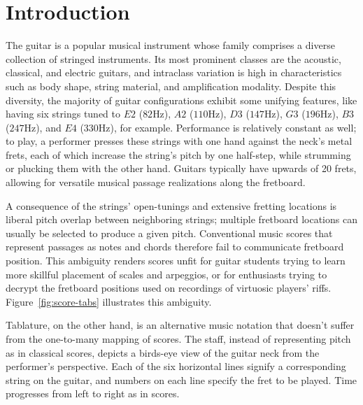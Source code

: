 \documentclass[12pt]{cmuthesis}
\begin{document}
\chapter{Introduction} 
The guitar is a popular musical instrument whose family comprises a diverse collection of stringed instruments. Its most prominent classes are the acoustic, classical, and electric guitars, and intraclass variation is high in characteristics such as body shape, string material, and amplification modality. Despite this diversity, the majority of guitar configurations exhibit some unifying features, like having six strings tuned to $E2$ ($82$Hz), $A2$ ($110$Hz), $D3$ ($147$Hz), $G3$ ($196$Hz), $B3$ ($247$Hz), and $E4$ ($330$Hz), for example. Performance is relatively constant as well; to play, a performer presses these strings with one hand against the neck's metal frets, each of which increase the string's pitch by one half-step, while strumming or plucking them with the other hand. Guitars typically have upwards of 20 frets, allowing for versatile musical passage realizations along the fretboard.

A consequence of the strings' open-tunings and extensive fretting locations is liberal pitch overlap between neighboring strings; multiple fretboard locations can usually be selected to produce a given pitch. Conventional music scores that represent passages as notes and chords therefore fail to communicate fretboard position. This ambiguity renders scores unfit for guitar students trying to learn more skillful placement of scales and arpeggios, or for enthusiasts trying to decrypt the fretboard positions used on recordings of virtuosic players' riffs. Figure~\ref{fig:score-tabs} illustrates this ambiguity.

Tablature, on the other hand, is an alternative music notation that doesn't suffer from the one-to-many mapping of scores. The staff, instead of representing pitch as in classical scores, depicts a birds-eye view of the guitar neck from the performer's perspective. Each of the six horizontal lines signify a corresponding string on the guitar, and numbers on each line specify the fret to be played. Time progresses from left to right as in scores. 
\end{document}
